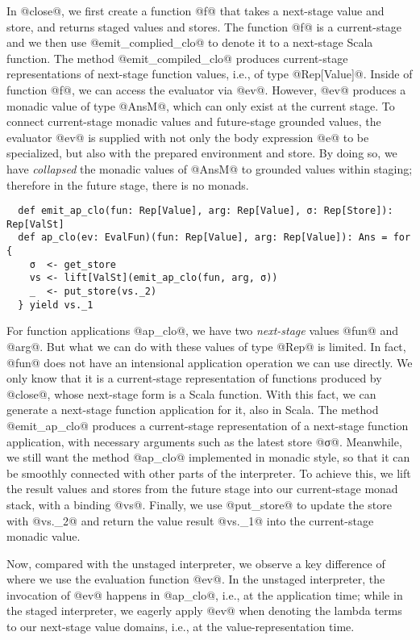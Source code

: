 In @close@, we first create a function @f@ that takes a next-stage value and
store, and returns staged values and stores. The function @f@ is a
current-stage and we then use @emit_complied_clo@ to denote it to a next-stage
Scala function.
The method @emit_compiled_clo@ produces current-stage representations of
next-stage function values, i.e., of type @Rep[Value]@.
Inside of function @f@, we can access the evaluator via @ev@.
However, @ev@ produces a monadic value of type @AnsM@, which can only exist at
the current stage. To connect current-stage monadic values and future-stage
grounded values, the evaluator @ev@ is supplied with not only the body
expression @e@ to be specialized, but also with the prepared environment and
store.  By doing so, we have \textit{collapsed} the monadic values of @AnsM@ to
grounded values within staging; therefore in the future stage, there is no
monads.
\begin{lstlisting}
  def emit_ap_clo(fun: Rep[Value], arg: Rep[Value], σ: Rep[Store]): Rep[ValSt]
  def ap_clo(ev: EvalFun)(fun: Rep[Value], arg: Rep[Value]): Ans = for {
    σ  <- get_store
    vs <- lift[ValSt](emit_ap_clo(fun, arg, σ))
    _  <- put_store(vs._2)
  } yield vs._1
\end{lstlisting}

For function applications @ap_clo@, we have two \textit{next-stage} values @fun@
and @arg@. But what we can do with these values of type @Rep@ is limited. 
In fact, @fun@ does not have an intensional application operation we can use
directly. We only know that it is a current-stage representation of functions produced by @close@,
whose next-stage form is a Scala function.
With this fact, we can generate a next-stage function application for it, also in
Scala. The method @emit_ap_clo@ produces a current-stage representation
of a next-stage function application, with necessary arguments such as the latest
store @σ@. Meanwhile, we still want the method @ap_clo@ implemented in monadic
style, so that it can be smoothly connected with other parts of the
interpreter.  To achieve this, we lift the result values and stores from
the future stage into our current-stage monad stack, with a binding @vs@.
Finally, we use @put_store@ to update the store with @vs._2@ and return the
value result @vs._1@ into the current-stage monadic value.

Now, compared with the unstaged interpreter, we observe a key difference of where
we use the evaluation function @ev@.  In the unstaged interpreter, the
invocation of @ev@ happens in @ap_clo@, i.e., at the application time; while in
the staged interpreter, we eagerly apply @ev@ when denoting the lambda terms to
our next-stage value domains, i.e., at the value-representation time.

